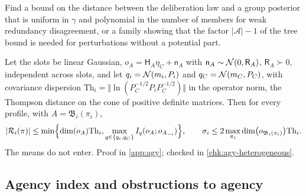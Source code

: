 \begin{openproblem}\label{open:agy-uniform-bound}
Find a bound on the distance between the deliberation law and a group posterior that is uniform in $\gamma$ and polynomial in the number of members for weak redundancy disagreement, or a family showing that the factor $\lvert\mathcal A\rvert-1$ of the tree bound is needed for perturbations without a potential part.
\end{openproblem}

\begin{proposition}\label{prop:agy-dispersion}
Let the slots be linear Gaussian, $o_A=\mathsf H_A\eta_C+\mathsf n_A$ with $\mathsf n_A\sim\mathcal{N}(0,\mathsf R_A)$, $\mathsf R_A\succ0$, independent across slots, and let $q_i=\mathcal{N}(m_i,P_i)$ and $q_C=\mathcal{N}(m_C,P_C)$, with covariance dispersion $\mathrm{Th}_i=\Vert\ln(P_C^{-1/2}P_iP_C^{-1/2})\Vert$ in the operator norm, the Thompson distance on the cone of positive definite matrices. Then for every profile, with $A=\mathfrak B_i(\pi_i)$,
\begin{equation}\label{eq:agy-dispersion}
\lvert\mathcal R_i(\pi)\rvert\le\min\Bigl\{\dim(o_A)\mathrm{Th}_i,\max_{q\in\{q_i,q_C\}}I_q(o_A;o_{A_{-i}})\Bigr\},\qquad\sigma_i\le2\max_{\pi_i}\dim\bigl(o_{\mathfrak B_i(\pi_i)}\bigr)\mathrm{Th}_i.
\end{equation}
The means do not enter. Proof in \cref{app:agy}; checked in \cref{chk:agy-heterogeneous}.
\end{proposition}

\subsection{Agency index and obstructions to agency}\label{sup:agy-agency-index-and-obstructions-to-agency}

